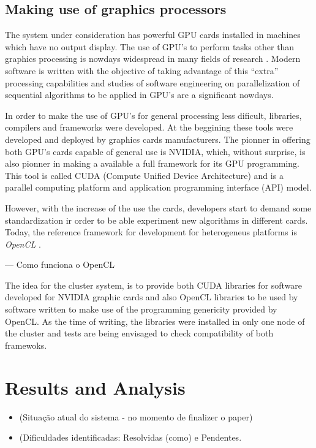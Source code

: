 \documentclass{anstrans}
\begin{document}
\subsection{Making use of graphics processors}

The system under consideration has powerful GPU cards installed in machines
which have no output display. The use of GPU's to perform tasks other than graphics processing
is nowdays widespread in many fields of research \cite{UsoDeGpus}. Modern software is written with
the objective of taking advantage of this ``extra'' processing capabilities and studies of software
engineering on parallelization of sequential algorithms to be applied in GPU's are a significant
nowdays.

In order to make the use of GPU's for general processing less dificult, libraries, compilers and
frameworks were developed. At the beggining these tools were developed and deployed by graphics cards
manufacturers. The pionner in offering both GPU's cards capable of general use is NVIDIA, which,
without surprise, is also pionner in making a available a full framework for its GPU programming.
This tool is called CUDA (Compute Unified Device Architecture) and is a parallel computing platform
and application programming interface (API) model.

However, with the increase of the use the cards, developers start to demand some
standardization ir order to be able experiment new algorithms in different cards. Today, the
reference framework for development for heterogeneus platforms is \textit{OpenCL} \cite{OpenCL}.

--- Como funciona o OpenCL

The idea for the cluster system, is to provide both CUDA libraries for
software developed for NVIDIA graphic cards and also OpenCL libraries to
be used by software written to make use of the programming genericity
provided by OpenCL. As the time of writing, the libraries were installed
in only one node of the cluster and tests are being envisaged to check
compatibility of both framewoks.


\section{Results and Analysis}

\begin{itemize}

\item (Situação atual do sistema - no momento de finalizer o paper)
\item (Dificuldades identificadas: Resolvidas (como) e Pendentes.
  
\end{itemize}
\end{document}
